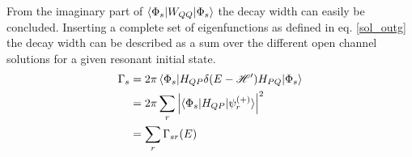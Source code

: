 From the imaginary part of $\braket{\Phi_s|W_{QQ}|\Phi_s}$ the decay width can
easily be concluded. Inserting a complete set
of eigenfunctions as defined in eq. \ref{sol_outg} the decay width can be described
as a sum over the different open channel solutions for a given resonant initial state.
\begin{align}
  \Gamma_s & = 2 \pi \braket{\Phi_s|H_{QP}\delta(E-\mathscr{H}')H_{PQ}|\Phi_s}\\
           & = 2 \pi \sum\limits_r \left | \braket{\Phi_s|H_{QP}|\psi_r^{(+)}} \right|^2\\
           & = \sum\limits_r \Gamma_{sr}(E)
\end{align}
